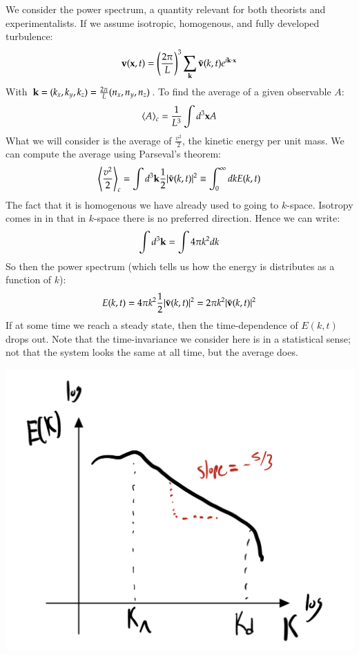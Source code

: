 We consider the power spectrum, a quantity relevant for both theorists and experimentalists. If we assume isotropic, homogenous, and fully developed turbulence:
\begin{equation}
    \mathbf{v}(\mathbf{x}, t) = \left(\frac{2\pi}{L}\right)^3\sum_{\mathbf{k}}\tilde{\mathbf{v}}(k, t)e^{i\mathbf{k} \cdot \mathbf{x}}
\end{equation}
With $\mathbf{k} = (k_x, k_y, k_z) = \frac{2\pi}{L}(n_x, n_y, n_z)$. To find the average of a given observable $A$:
\begin{equation}
    \left< A \right>_c = \frac{1}{L^3}\int d^3\mathbf{x}A
\end{equation}
What we will consider is the average of $\frac{v^2}{2}$, the kinetic energy per unit mass. We can compute the average using Parseval's theorem:
\begin{equation}
    \left< \frac{v^2}{2} \right>_c = \int d^3\mathbf{k}\frac{1}{2}\lvert \tilde{\mathbf{v}}(k, t) \rvert^2 \equiv \int_0^\infty dk E(k, t)
\end{equation}
The fact that it is homogenous we have already used to going to $k$-space. Isotropy comes in in that in $k$-space there is no preferred direction. Hence we can write:
\begin{equation}
    \int d^3\mathbf{k} = \int 4\pi k^2 dk
\end{equation}
So then the power spectrum (which tells us how the energy is distributes as a function of $k$):
\begin{equation}
    E(k, t) = 4\pi k^2 \frac{1}{2}\lvert \tilde{\mathbf{v}}(k, t) \rvert^2 = 2\pi k^2\lvert \tilde{\mathbf{v}}(k, t) \rvert^2
\end{equation}
If at some time we reach a steady state, then the time-dependence of $E(k, t)$ drops out. Note that the time-invariance we consider here is in a statistical sense; not that the system looks the same at all time, but the average does.

\begin{center}
    \includegraphics[scale=0.35]{Lectures/Images/lec11-spectrum.png}
\end{center}

